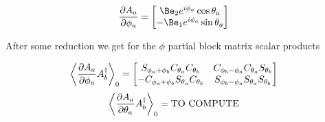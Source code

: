 \begin{align}\label{eqn:multiPendulumSpherical2:boo11}
\PD{\phi_a}{A_a}
&=
\begin{bmatrix}
\Be_2 e^{i \phi_a} \cos\theta_a \\
-\Be_1 e^{i \phi_a} \sin\theta_a
\end{bmatrix}
\end{align}

After some reduction we get for the $\phi$ partial block matrix scalar products

\begin{align}\label{eqn:multiPendulumSpherical2:boo13}
\gpgradezero{ \PD{\phi_a}{A_a} A_b^\dagger}
&=
\begin{bmatrix}
S_{\phi_a + \phi_b} C_{\theta_a} C_{\theta_b} & C_{\phi_b - \phi_a} C_{\theta_a} S_{\theta_b} \\
-C_{\phi_a + \phi_b} S_{\theta_a} C_{\theta_b} & S_{\phi_b - \phi_a} S_{\theta_a} S_{\theta_b} \\
\end{bmatrix}
\end{align}
\begin{align}\label{eqn:multiPendulumSpherical2:boo14}
\gpgradezero{ \PD{\theta_a}{A_a} A_b^\dagger}
&=
\text{TO COMPUTE}
\end{align}

\EndNoBibArticle

